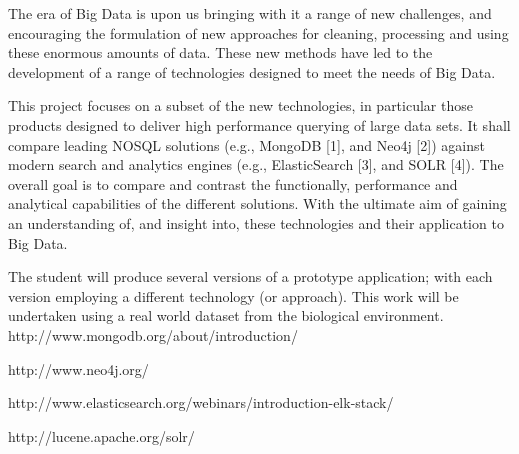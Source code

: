 The era of Big Data is upon us bringing with it a range of new challenges, and encouraging the formulation of new approaches for cleaning, processing and using these enormous amounts of data. These new methods have led to the development of a range of technologies designed to meet the needs of Big Data.

This project focuses on a subset of the new technologies, in particular those products designed to deliver high performance querying of large data sets.  It shall compare leading NOSQL solutions (e.g., MongoDB [1], and Neo4j [2]) against modern search and analytics engines (e.g., ElasticSearch [3], and SOLR [4]).  The overall goal is to compare and contrast the functionally, performance and analytical capabilities of the different solutions.  With the ultimate aim of gaining an understanding of, and insight into, these technologies and their application to Big Data.
	
The student will produce several versions of a prototype application; with each version employing a different technology (or approach). This work will be undertaken using a real world dataset from the biological environment.\\[2em]

\noindent [1] http://www.mongodb.org/about/introduction/

\noindent [2] http://www.neo4j.org/

\noindent [3] http://www.elasticsearch.org/webinars/introduction-elk-stack/ 

\noindent [4] http://lucene.apache.org/solr/